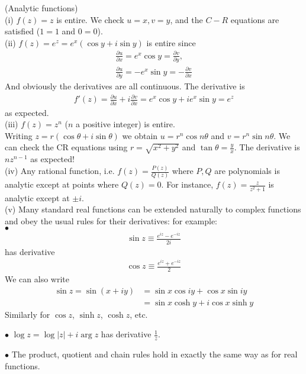 \documentclass[a4paper]{article}
\begin{document}
\begin{eg} (Analytic functions)\\
(i) $f(z)=z$ is entire. We check $u=x,v=y$, and the $C-R$ equations are satisfied ($1=1$ and $0=0$).\\
(ii) $f(z)=e^z = e^x(\cos y+i\sin y)$ is entire since
\begin{equation*}
\begin{aligned}
\frac{\partial u}{\partial x} = e^x \cos y =\frac{\partial v}{\partial y},\\
\frac{\partial u}{\partial y} = -e^x \sin y = -\frac{\partial v}{\partial x}
\end{aligned}
\end{equation*}
And obviously the derivatives are all continuous. The derivative is
\begin{equation*}
\begin{aligned}
f'(z)=\frac{\partial u}{\partial x} + i\frac{\partial v}{\partial x} = e^x \cos y + ie^x \sin y = e^z
\end{aligned}
\end{equation*}
as expected.\\
(iii) $f(z)=z^n$ ($n$ a positive integer) is entire.\\
Writing $z=r(\cos\theta + i\sin\theta)$ we obtain $u=r^n \cos n\theta$ and $v=r^n \sin n\theta$. We can check the CR equations using $r=\sqrt{x^2+y^2}$ and $\tan \theta = \frac{y}{x}$. The derivative is $nz^{n-1}$ as expected!\\
(iv) Any rational function, i.e. $f(z) = \frac{P(z)}{Q(z)}$ where $P,Q$ are polynomials is analytic except at points where $Q(z)=0$. For instance, $f(z)=\frac{z}{z^2+1}$ is analytic except at $\pm i$.\\
(v) Many standard real functions can be extended naturally to complex functions and obey the usual rules for their derivatives: for example:\\
$\bullet$
\begin{equation*}
\begin{aligned}
\sin z \equiv \frac{e^{iz}-e^{-iz}}{2i}
\end{aligned}
\end{equation*}
has derivative
\begin{equation*}
\begin{aligned}
\cos z \equiv \frac{e^{iz}+e^{-iz}}{2}
\end{aligned}
\end{equation*}
We can also write
\begin{equation*}
\begin{aligned}
\sin z = \sin(x+iy) &= \sin x \cos iy + \cos x \sin iy\\
&=\sin x \cosh y + i \cos x \sinh y
\end{aligned}
\end{equation*}
Similarly for $\cos z$, $\sinh z$, $\cosh z$, etc.

$\bullet$ $\log z = \log|z|+i\arg z$ has derivative $\frac{1}{z}$.

$\bullet$ The product, quotient and chain rules hold in exactly the same way as for real functions. 
\end{eg}
\end{document}
